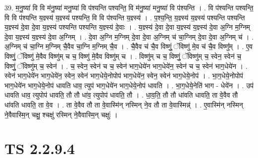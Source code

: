 \documentclass[17pt]{extarticle}
\begin{document}
39. म॒नु॒ष्या॑ वि वि म॑नु॒ष्या॑ मनु॒ष्या॑ वि प॑श्यन्ति पश्यन्ति॒ वि म॑नु॒ष्या॑ मनु॒ष्या॑ वि प॑श्यन्ति । . वि प॑श्यन्ति पश्यन्ति॒ वि वि प॑श्यन्ति य॒ज्ञ्स्य॑ य॒ज्ञ्स्य॑ पश्यन्ति॒ वि वि प॑श्यन्ति य॒ज्ञ्स्य॑ । . प॒श्य॒न्ति॒ य॒ज्ञ्स्य॑ य॒ज्ञ्स्य॑ पश्यन्ति पश्यन्ति य॒ज्ञ्स्य॑ दे॒वा दे॒वा य॒ज्ञ्स्य॑ पश्यन्ति पश्यन्ति य॒ज्ञ्स्य॑ दे॒वाः । . य॒ज्ञ्स्य॑ दे॒वा दे॒वा य॒ज्ञ्स्य॑ य॒ज्ञ्स्य॑ दे॒वा अ॒ग्नि म॒ग्निम् दे॒वा य॒ज्ञ्स्य॑ य॒ज्ञ्स्य॑ दे॒वा अ॒ग्निम् । . दे॒वा अ॒ग्नि म॒ग्निम् दे॒वा दे॒वा अ॒ग्निम् च॑ चा॒ग्निम् दे॒वा दे॒वा अ॒ग्निम् च॑ । . अ॒ग्निम् च॑ चा॒ग्नि म॒ग्निम् चै॒वैव चा॒ग्नि म॒ग्निम् चै॒व । . चै॒वैव च॑ चै॒व विष्णुं॒ ॅविष्णु॑ मे॒व च॑ चै॒व विष्णु᳚म् । . ए॒व विष्णुं॒ ॅविष्णु॑ मे॒वैव विष्णु॑म् च च॒ विष्णु॑ मे॒वैव विष्णु॑म् च । . विष्णु॑म् च च॒ विष्णुं॒ ॅविष्णु॑म् च॒ स्वेन॒ स्वेन॑ च॒ विष्णुं॒ ॅविष्णु॑म् च॒ स्वेन॑ । . च॒ स्वेन॒ स्वेन॑ च च॒ स्वेन॑ भाग॒धेये॑न भाग॒धेये॑न॒ स्वेन॑ च च॒ स्वेन॑ भाग॒धेये॑न । . स्वेन॑ भाग॒धेये॑न भाग॒धेये॑न॒ स्वेन॒ स्वेन॑ भाग॒धेये॒नोपोप॑ भाग॒धेये॑न॒ स्वेन॒ स्वेन॑ भाग॒धेये॒नोप॑ । . भा॒ग॒धेये॒नोपोप॑ भाग॒धेये॑न भाग॒धेये॒नोप॑ धावति धाव॒ त्युप॑ भाग॒धेये॑न भाग॒धेये॒नोप॑ धावति । . भा॒ग॒धेये॒नेति॑ भाग - धेये॑न । . उप॑ धावति धाव॒ त्युपोप॑ धावति॒ तौ तौ धा॑व॒ त्युपोप॑ धावति॒ तौ । . धा॒व॒ति॒ तौ तौ धा॑वति धावति॒ ता वे॒वैव तौ धा॑वति धावति॒ ता वे॒व । . ता वे॒वैव तौ ता वे॒वास्मि॑न् नस्मिन् ने॒व तौ ता वे॒वास्मिन्न्॑ । . ए॒वास्मि॑न् नस्मिन् ने॒वैवास्मि॒न् चक्षु॒ श्चक्षु॑ रस्मिन् ने॒वैवास्मि॒न् चक्षुः॑ । \newline
\pagebreak
{}
\section*{ TS 2.2.9.4 }
\end{document}
